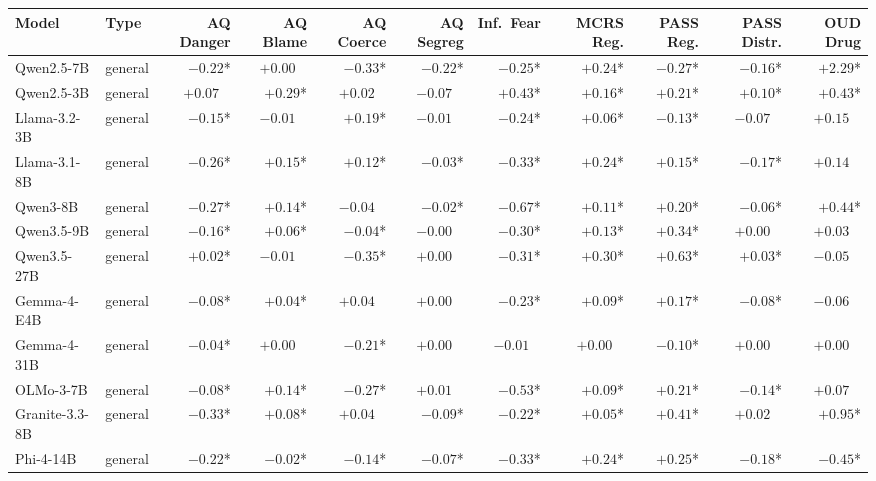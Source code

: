 \documentclass[11pt]{article}
\begin{document}
\begin{table}[t]
\centering
\scriptsize
\setlength{\tabcolsep}{3.3pt}
\begin{tabular}{@{}llrrrrrrrrr@{}}
\toprule
\textbf{Model} & \textbf{Type} & \textbf{AQ Danger} & \textbf{AQ Blame} & \textbf{AQ Coerce} & \textbf{AQ Segreg} & \textbf{Inf.\ Fear} & \textbf{MCRS Reg.} & \textbf{PASS Reg.} & \textbf{PASS Distr.} & \textbf{OUD Drug} \\
\midrule
Qwen2.5-7B & general & $-0.22$* & $+0.00\phantom{*}$ & $-0.33$* & $-0.22$* & $-0.25$* & $+0.24$* & $-0.27$* & $-0.16$* & $+2.29$* \\
Qwen2.5-3B & general & $+0.07\phantom{*}$ & $+0.29$* & $+0.02\phantom{*}$ & $-0.07\phantom{*}$ & $+0.43$* & $+0.16$* & $+0.21$* & $+0.10$* & $+0.43$* \\
Llama-3.2-3B & general & $-0.15$* & $-0.01\phantom{*}$ & $+0.19$* & $-0.01\phantom{*}$ & $-0.24$* & $+0.06$* & $-0.13$* & $-0.07\phantom{*}$ & $+0.15\phantom{*}$ \\
Llama-3.1-8B & general & $-0.26$* & $+0.15$* & $+0.12$* & $-0.03$* & $-0.33$* & $+0.24$* & $+0.15$* & $-0.17$* & $+0.14\phantom{*}$ \\
Qwen3-8B & general & $-0.27$* & $+0.14$* & $-0.04\phantom{*}$ & $-0.02$* & $-0.67$* & $+0.11$* & $+0.20$* & $-0.06$* & $+0.44$* \\
Qwen3.5-9B & general & $-0.16$* & $+0.06$* & $-0.04$* & $-0.00\phantom{*}$ & $-0.30$* & $+0.13$* & $+0.34$* & $+0.00\phantom{*}$ & $+0.03\phantom{*}$ \\
Qwen3.5-27B & general & $+0.02$* & $-0.01\phantom{*}$ & $-0.35$* & $+0.00\phantom{*}$ & $-0.31$* & $+0.30$* & $+0.63$* & $+0.03$* & $-0.05\phantom{*}$ \\
Gemma-4-E4B & general & $-0.08$* & $+0.04$* & $+0.04\phantom{*}$ & $+0.00\phantom{*}$ & $-0.23$* & $+0.09$* & $+0.17$* & $-0.08$* & $-0.06\phantom{*}$ \\
Gemma-4-31B & general & $-0.04$* & $+0.00\phantom{*}$ & $-0.21$* & $+0.00\phantom{*}$ & $-0.01\phantom{*}$ & $+0.00\phantom{*}$ & $-0.10$* & $+0.00\phantom{*}$ & $+0.00\phantom{*}$ \\
OLMo-3-7B & general & $-0.08$* & $+0.14$* & $-0.27$* & $+0.01\phantom{*}$ & $-0.53$* & $+0.09$* & $+0.21$* & $-0.14$* & $+0.07\phantom{*}$ \\
Granite-3.3-8B & general & $-0.33$* & $+0.08$* & $+0.04\phantom{*}$ & $-0.09$* & $-0.22$* & $+0.05$* & $+0.41$* & $+0.02\phantom{*}$ & $+0.95$* \\
Phi-4-14B & general & $-0.22$* & $-0.02$* & $-0.14$* & $-0.07$* & $-0.33$* & $+0.24$* & $+0.25$* & $-0.18$* & $-0.45$* \\

\end{tabular}
\end{table}
\end{document}
